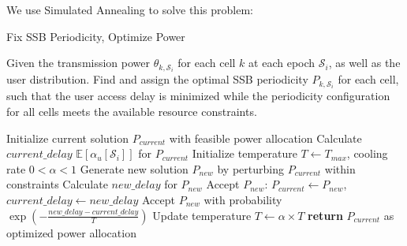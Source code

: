 We use Simulated Annealing to solve this problem:

\begin{algorithm}[H]
    \caption{Fix SSB Periodicity, Optimize Power}
    \label{alg:FSOP}
    \begin{algorithmic}[1]
        \REQUIRE{}
        Given the transmission power $\theta_{k,\mathcal{S}_i}$ for each cell $k$ at each epoch $\mathcal{S}_i$, as well as the user distribution.
        \ENSURE
        Find and assign the optimal SSB periodicity $P_{k, \mathcal{S}_i}$ for each cell, such that the user access delay is minimized while the periodicity configuration for all cells meets the available resource constraints.
        
        \STATE Initialize current solution $P_{current}$ with feasible power allocation
        \STATE Calculate $current\_delay$ $\mathbb{E}[\alpha_u[\mathcal{S}_i]]$ for $P_{current}$
        \STATE Initialize temperature $T \gets T_{max}$, cooling rate $0 < \alpha < 1$
            \STATE Generate new solution $P_{new}$ by perturbing $P_{current}$ within constraints
            \STATE Calculate $new\_delay$ for $P_{new}$
                \STATE Accept $P_{new}$: $P_{current} \gets P_{new}$, $current\_delay \gets new\_delay$
            \ELSE
                \STATE Accept $P_{new}$ with probability $\exp\left(-\frac{new\_delay - current\_delay}{T}\right)$
            \ENDIF
            \STATE Update temperature $T \gets \alpha \times T$
        \ENDWHILE
        \STATE \textbf{return} $P_{current}$ as optimized power allocation
    \end{algorithmic}
\end{algorithm}



